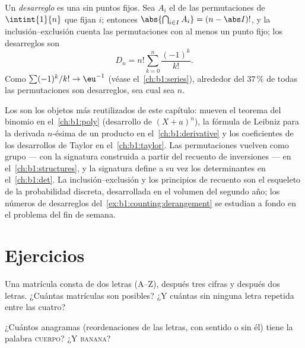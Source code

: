 \begin{example}[Desarreglos]\label{ex:b1:counting:derangement}
Un \emph{desarreglo} es una  sin puntos fijos. Sea $A_i$ el
 de las permutaciones de $\intint{1}{n}$ que fijan $i$;
entonces $\abs{\bigcap_{i \in I} A_i} = (n - \abs I)!$, y la
inclusión--exclusión cuenta las permutaciones con al menos un punto
fijo; los desarreglos son
\[
D_n = n! \sum_{k=0}^{n} \frac{(-1)^k}{k!} .
\]
Como $\sum (-1)^k / k! \to \eu^{-1}$ (véase el~\cref{ch:b1:series}),
alrededor del $37\,\%$ de todas las permutaciones son desarreglos, sea cual
sea $n$.
\end{example}

\begin{remark}\label{rem:b1:counting:whereused}
Los  son los objetos más reutilizados de este
capítulo: mueven el teorema del binomio en el~\cref{ch:b1:poly}
(desarrollo de $(X + a)^n$), la fórmula de Leibniz para la derivada
$n$-ésima de un producto en el~\cref{ch:b1:derivative} y los
coeficientes de los desarrollos de Taylor en el~\cref{ch:b1:taylor}. Las
permutaciones vuelven como grupo --- con la signatura construida a
partir del recuento de inversiones --- en el~\cref{ch:b1:structures}, y
la signatura define a su vez los determinantes en el~\cref{ch:b1:det}.
La inclusión--exclusión y los principios de recuento son el esqueleto
 de la probabilidad discreta, desarrollada en el volumen del
segundo año; los números de desarreglos del~\cref{ex:b1:counting:derangement}
se estudian a fondo en el problema del fin de semana.
\end{remark}

\section{Ejercicios}

\begin{exercise}[$\star$]\label{exo:b1:counting:1}
Una matrícula consta de dos letras (A--Z), después tres cifras y
después dos letras. ¿Cuántas matrículas son posibles? ¿Y cuántas sin
ninguna letra repetida entre las cuatro?
\end{exercise}

\begin{exercise}[$\star$]\label{exo:b1:counting:2}
¿Cuántos anagramas (reordenaciones de las letras, con sentido o sin él)
tiene la palabra \textsc{cuerpo}? ¿Y \textsc{banana}?
\end{exercise}

